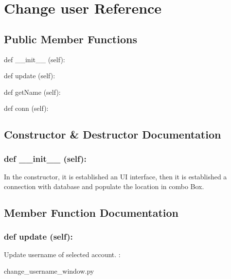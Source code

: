 \hypertarget{Change_user}{\section{Change user Reference}
\label{Change_user}
}
\subsection*{Public Member Functions}
\begin{DoxyCompactItemize}
\item 
def {\_\_init\_\_} (self):
\item 
def {update} (self):
\item 
def {getName} (self):
\item 
def {conn} (self):
\end{DoxyCompactItemize}

\subsection{Constructor \& Destructor Documentation}
\hypertarget{class_poly_aa3def076b74bed67904976ad4f9fe9b1}{
\subsubsection[{def __init__ (self):}]{\setlength{\rightskip}{0pt plus 5cm}def {\_\_init\_\_} (self): 
}}
In the constructor, it is established an UI interface, then it is  established a connection with database and populate the location in combo Box.
 

\subsection{Member Function Documentation}
\hypertarget{class_poly_a14a7ad77ce612b0c54f531d307ee4b39}{
\subsubsection[{def update (self):}]{\setlength{\rightskip}{0pt plus 5cm}def {update} (self):}}\label{class_poly_a14a7ad77ce612b0c54f531d307ee4b39}
Update username of selected account.
:\begin{DoxyCompactItemize}
\item 
change\_username\_window.\-py\end{DoxyCompactItemize}

